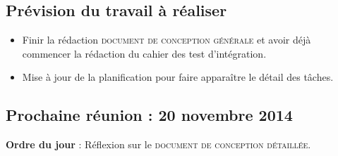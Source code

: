 \documentclass[12pt,a4paper]{article}
\begin{document}
\subsection*{Prévision du travail à réaliser}

\begin{itemize}[label = $\blacktriangleright$]

\item Finir la rédaction \textsc{document de conception générale} et avoir déjà commencer la rédaction du cahier des test d'intégration.

\item Mise à jour de la planification pour faire apparaître le détail des tâches.\\
\end{itemize}

\subsection*{Prochaine réunion : 20 novembre 2014}

\textbf{Ordre du jour} : Réflexion sur le \textsc{document de conception détaillée}.\\
\end{document}
